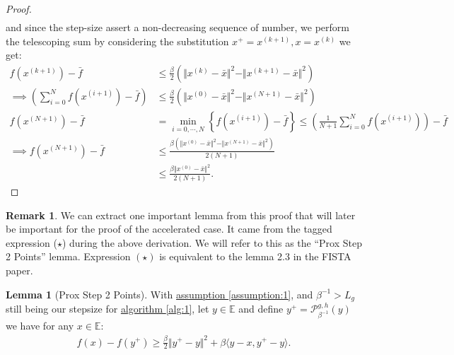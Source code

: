 \documentclass[]{article}
\theoremstyle{definition}
\newtheorem{lemma}{Lemma}[subsection]  %
\newtheorem{remark}{Remark}[subsection]
{
    \newtheorem{assumption}{Assumption}
}
\begin{document}
\begin{proof}
\begin{align*}
            \end{align*}
            and since the step-size assert a non-decreasing sequence of number, we perform the telescoping sum by considering the substitution $x^+ = x^{(k + 1)}, x = x^{(k)}$ we get: 
            \begin{align*}
                f(x^{(k + 1)}) - \bar f 
                &\le
                \frac{\beta}{2}(\Vert x^{(k)} - \bar x\Vert^2 - \Vert x^{(k + 1)} - \bar x\Vert^2)
                \\
                \implies
                \left(
                    \sum_{i = 0}^{N} f(x^{(i + 1)})
                    - \bar f
                \right)
                &\le
                \frac{\beta}{2}
                (\Vert x^{(0)} - \bar x\Vert^2 - \Vert x^{(N + 1)} - \bar x\Vert^2)
                \\
                f(x^{(N + 1)}) - \bar f & = 
                \min_{i = 0, \cdots, N}\left\lbrace
                    f(x^{(i + 1)}) - \bar f
                \right\rbrace \le 
                \left(
                    \frac{1}{N + 1}\sum_{i = 0}^{N}f(x^{(i + 1)})
                \right) - \bar f
                \\
                \implies
                f(x^{(N + 1)}) - \bar f
                &\le  
                \frac{\beta(\Vert x^{(0)} - \bar x\Vert^2 - \Vert x^{(N + 1)} - \bar x\Vert^2)}{2(N + 1)}
                \\
                &\le 
                \frac{\beta \Vert x^{(0)} - \bar x\Vert^2 }{2(N + 1)}. 
            \end{align*}
        \end{proof}
        \begin{remark}
            We can extract one important lemma from this proof that will later be important for the proof of the accelerated case. It came from the tagged expression ($\star$) during the above derivation. We will refer to this as the ``Prox Step 2 Points'' lemma. Expression $(\star)$ is equivalent to the lemma 2.3 in the FISTA paper\cite{paper:FISTA}. 
        \end{remark}
        \begin{lemma}[Prox Step 2 Points]\label{lemma:prox_two_p}
            With \hyperref[assumption:1]{assumption \ref*{assumption:1}}, and $\beta^{-1} > L_g$ still being our stepsize for \hyperref[alg:1]{algorithm \ref*{alg:1}}, let $y\in \mathbb E$ and define $y^+ = \mathcal P_{\beta^{-1}}^{g, h}(y)$ we have for any $x\in \mathbb E$: 
            \begin{align*}
                f(x) - f(y^+) \ge \frac{\beta}{2}\Vert y^+ - y\Vert^2 + 
                \beta \langle y - x, y^+ - y\rangle. 
            \end{align*}
        \end{lemma}
\end{document}
